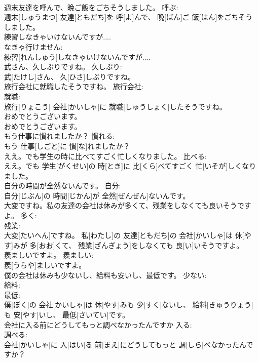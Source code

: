 \documentclass[8pt]{extreport}
\begin{document}
\begin{CJK}{UTF8}{min}
\\	週末友達を呼んで、晩ご飯をごちそうしました。	呼ぶ: 
\\	週末[しゅうまつ] 友達[ともだち]を 呼[よ]んで、 晩[ばん]ご 飯[はん]をごちそうしました。	
\\	練習しなきゃいけないんですが....	
\\	なきゃ行けません: 
\\	練習[れんしゅう]しなきゃいけないんですが....		
\\	武さん、久しぶりですね。	久しぶり: 
\\	武[たけし]さん、 久[ひさ]しぶりですね。	
\\	旅行会社に就職したそうですね。	旅行会社: 
\\	就職: 
\\	旅行[りょこう] 会社[かいしゃ]に 就職[しゅうしょく]したそうですね。	
\\	おめでとうございます。	
\\	おめでとうございます。		
\\	もう仕事に慣れましたか？	慣れる: 
\\	もう 仕事[しごと]に 慣[な]れましたか？	
\\	ええ。でも学生の時に比べてすごく忙しくなりました。	比べる: 
\\	ええ。でも 学生[がくせい]の 時[とき]に 比[くら]べてすごく 忙[いそが]しくなりました。	
\\	自分の時間が全然ないんです。	自分: 
\\	自分[じぶん]の 時間[じかん]が 全然[ぜんぜん]ないんです。	
\\	大変ですね。私の友達の会社は休みが多くて、残業をしなくても良いそうですよ。	多く: 
\\	残業: 
\\	大変[たいへん]ですね。 私[わたし]の 友達[ともだち]の 会社[かいしゃ]は 休[やす]みが 多[おお]くて、 残業[ざんぎょう]をしなくても 良[い]いそうですよ。	
\\	羨ましいですよ。	羨ましい: 
\\	羨[うらや]ましいですよ。		
\\	僕の会社は休みも少ないし、給料も安いし、最低です。	少ない: 
\\	給料: 
\\	最低: 
\\	僕[ぼく]の 会社[かいしゃ]は 休[やす]みも 少[すく]ないし、 給料[きゅうりょう]も 安[やす]いし、 最低[さいてい]です。	
\\	会社に入る前にどうしてもっと調べなかったんですか	入る: 
\\	調べる: 
\\	会社[かいしゃ]に 入[はい]る 前[まえ]にどうしてもっと 調[しら]べなかったんですか？	

\end{CJK}
\end{document}

